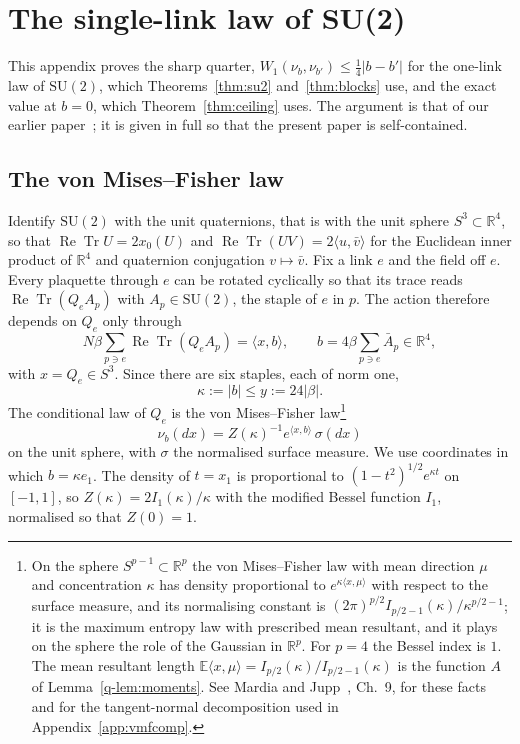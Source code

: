 \documentclass[11pt]{amsart}
\theoremstyle{definition}
\theoremstyle{remark}
\numberwithin{equation}{section}
\newcommand{\R}{\mathbb{R}}
\newcommand{\E}{\mathbb{E}}
\newcommand{\SU}{\mathrm{SU}}
\newcommand{\ReTr}{\operatorname{Re}\operatorname{Tr}}
\newcommand{\ip}[2]{\langle #1,#2\rangle}
\begin{document}
\section{The single-link law of SU(2)}\label{app:sharp}

This appendix proves the sharp quarter, $W_1(\nu_b,\nu_{b'})\le\frac14|b-b'|$
for the one-link law of $\SU(2)$, which Theorems~\ref{thm:su2}
and~\ref{thm:blocks} use, and the exact value at $b=0$, which
Theorem~\ref{thm:ceiling} uses. The argument is that of our earlier
paper~\cite{BB26a}; it is given in full so that the present paper is
self-contained.

\subsection{The von Mises--Fisher law}

Identify $\SU(2)$ with the unit quaternions, that is with the unit sphere
$S^3\subset\R^4$, so that $\ReTr U=2x_0(U)$ and $\ReTr(UV)=2\ip u{\bar v}$
for the Euclidean inner product of $\R^4$ and quaternion conjugation
$v\mapsto\bar v$. Fix a link $e$ and the field off $e$. Every plaquette
through $e$ can be rotated cyclically so that its trace reads $\ReTr(Q_eA_p)$
with $A_p\in\SU(2)$, the staple of $e$ in $p$. The action therefore depends on
$Q_e$ only through
\[
N\beta\sum_{p\ni e}\ReTr(Q_eA_p)=\ip{x}{b},\qquad
b=4\beta\sum_{p\ni e}\bar A_p\in\R^4,
\]
with $x=Q_e\in S^3$. Since there are six staples, each of norm one,
\begin{equation}\label{q-eq:kappamax}
\kappa:=|b|\le y:=24|\beta| .
\end{equation}
The conditional law of $Q_e$ is the von Mises--Fisher law\footnote{On the
sphere $S^{p-1}\subset\R^p$ the von Mises--Fisher law with mean direction
$\mu$ and concentration $\kappa$ has density proportional to
$e^{\kappa\ip x\mu}$ with respect to the surface measure, and its normalising
constant is $(2\pi)^{p/2}I_{p/2-1}(\kappa)/\kappa^{p/2-1}$; it is the maximum
entropy law with prescribed mean resultant, and it plays on the sphere the
role of the Gaussian in $\R^p$. For $p=4$ the Bessel index is $1$. The mean
resultant length $\E\ip x\mu=I_{p/2}(\kappa)/I_{p/2-1}(\kappa)$ is the
function $A$ of Lemma~\ref{q-lem:moments}. See Mardia and Jupp~\cite{MJ00},
Ch.~9, for these facts and for the tangent-normal decomposition used in
Appendix~\ref{app:vmfcomp}.}
\begin{equation}\label{q-eq:vmf}
\nu_b(dx)=Z(\kappa)^{-1}e^{\ip xb}\,\sigma(dx)
\end{equation}
on the unit sphere, with $\sigma$ the normalised surface measure. We use
coordinates in which $b=\kappa e_1$. The density of $t=x_1$ is proportional
to $(1-t^2)^{1/2}e^{\kappa t}$ on $[-1,1]$, so $Z(\kappa)=2I_1(\kappa)/\kappa$
with the modified Bessel function $I_1$, normalised so that $Z(0)=1$.
\end{document}
